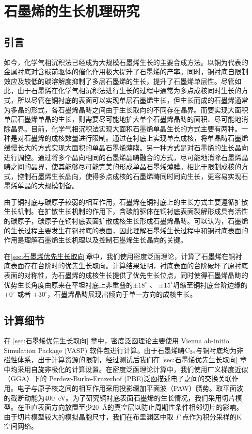
\chapter{石墨烯的生长机理研究}
\section{引言}
    如今，化学气相沉积法已经成为大规模石墨烯生长的主要合成方法。以铜为代表的金属衬底对含碳前驱体的催化作用极大提升了石墨烯的产率。同时，铜衬底自限制效应及较低的碳溶解度抑制了多层石墨烯的生长，提升了石墨烯单层性。尽管如此，由于石墨烯在化学气相沉积法进行生长的过程中通常为多点成核同时生长的方式，所以尽管在铜衬底的表面可以实现单层石墨烯生长，但生长而成的石墨烯通常为多晶的形式，各石墨烯晶畴之间由于生长取向的不同存在晶界。而要实现大面积单层石墨烯单晶的生长，则需要尽可能地扩大单个石墨烯晶畴的面积、尽可能地消除晶界。目前，化学气相沉积法实现大面积石墨烯单晶生长的方式主要有两种。一种是对石墨烯的成核数量进行限制。通过在衬底上实现单点成核，将单晶畴石墨烯缓慢长大的方式实现大面积的单晶石墨烯薄膜。另一种方式是对石墨烯的生长晶向进行调控。通过将多个晶向相同的石墨烯晶畴融合的方式，尽可能地消除石墨烯晶畴之间的晶界，使其能够尽可能完美的形成单晶石墨烯薄膜。相比于限制成核的方式，控制石墨烯生长晶向，使得多点成核的石墨烯畴同时同向生长，更容易实现石墨烯单晶的大规模制备。
    
    由于铜衬底与碳原子较弱的相互作用，石墨烯在铜衬底上的生长方式主要遵循扩散生长机制。在扩散生长机制的作用下，含碳前驱体在铜衬底表面裂解形成具有活性的碳原子，碳原子在铜衬底表面扩散成核生长形成石墨烯晶畴。可以认为，石墨烯的生长过程主要发生在铜衬底的表面，因此理解石墨烯生长过程中和铜衬底表面的作用是理解石墨烯生长机理以及控制石墨烯生长晶向的关键。%
    
    在\ref{sec:石墨烯优先生长取向}章中，我们使用密度泛函理论，计算了石墨烯在铜衬底表面存在台阶时的优先生长取向。计算结果证明，衬底表面的台阶破坏了原衬底表面的对称性，为石墨烯的成核生长提供了优先生长位点，同时使得石墨烯晶畴的优势生长角度由原来在平坦衬底上非重叠的$\pm 18 ^{\circ}$ 、 $\pm 15 ^{\circ}$坍缩至铜衬底台阶边缘的$\pm 0 ^{\circ}$ 或者 $\pm 30 ^{\circ}$，石墨烯晶畴展现出倾向于单一方向的成核生长。

\section{计算细节}
    在 \ref{sec:石墨烯优先生长取向} 章中，密度泛函理论主要使用 Vienna ab-initio Simulation Package (VASP) 软件包进行计算。由于石墨烯畴$\rm{C_{24}}$与铜衬底均为非磁性体系，出于计算资源的限制，经过测试后我们在 \ref{sec:石墨烯优先生长取向} 章中均采用自旋非极化的计算设置。在密度泛函理论计算中，我们使用广义梯度近似（GGA）下的 Perdew-Burke-Ernzerhof (PBE)泛函描述电子之间的交换关联作用。电子与原子核之间的相互作用采用投影缀加平面波（PAW）赝势。取平面波的截断动能为\SI{400}{\electronvolt}。为了研究铜衬底表面石墨烯的生长情况，我们采用切片模型。在垂直表面方向放置至少\SI{20}{\angstrom}的真空层以防止周期性条件相邻切片的影响。由于切片模型较大的模拟晶胞尺寸，我们在布里渊区中取 $\Gamma$ 点作为积分采样的K空间网络。
